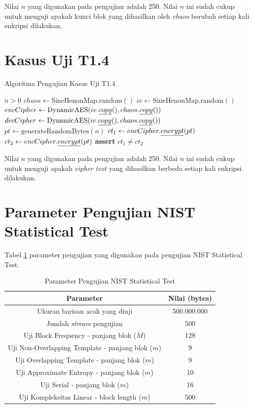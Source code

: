 Nilai $n$ yang digunakan pada pengujian adalah 250. Nilai $n$ ini sudah cukup untuk menguji apakah kunci blok yang dihasilkan oleh \emph{chaos} berubah setiap kali enkripsi dilakukan.

\section{Kasus Uji T1.4}

\begin{algorithm}
  \caption{Algoritma Pengujian Kasus Uji T1.4}
  \label{alg:unit.test.t1.4}
  \begin{algorithmic}
    \Require $n > 0$
    \State $chaos \gets \text{SineHenonMap.random}()$ 
    \State $iv \gets \text{SineHenonMap.random}()$
    \State $encCipher \gets \text{DynamicAES}(iv.\emph{copy}(), chaos.\emph{copy}())$
    \State $decCipher \gets \text{DynamicAES}(iv.\emph{copy}(), chaos.\emph{copy}())$
    \State
    \State $pt \gets \text{generateRandomBytes}(n)$ 
    \State $ct_1 \gets encCipher.\emph{encrypt}(pt)$
    \State $ct_2 \gets encCipher.\emph{encrypt}(pt)$
    \State
    \State \textbf{assert} $ct_1 \ne ct_2$
  \end{algorithmic}
\end{algorithm}

Nilai $n$ yang digunakan pada pengujian adalah 250. Nilai $n$ ini sudah cukup untuk menguji apakah \emph{cipher text} yang dihasilkan berbeda setiap kali enkripsi dilakukan.

\section{Parameter Pengujian NIST Statistical Test}

Tabel \ref{tab:param.statistic.test} parameter pengujian yang digunakan pada pengujian NIST Statistical Test.

\begin{table}[h]
  \centering
  \caption{Parameter Pengujian NIST Statistical Test}
  \label{tab:param.statistic.test}
  \begin{tabular}{|c|c|}
    \hline
    \textbf{Parameter} & \textbf{Nilai (bytes)} \\
    \hline
    {Ukuran barisan acak yang diuji} & 500.000.000 \\
    \hline
    {Jumlah \emph{stream} pengujian} & 500 \\
    \hline
    {Uji Block Frequency - panjang blok ($M$)} & 128 \\
    \hline
    {Uji Non-Overlapping Template - panjang blok ($m$)} & 9 \\
    \hline
    {Uji Overlapping Template - panjang blok ($m$)} & 9 \\
    \hline
    {Uji Approximate Entropy - panjang blok ($m$)} & 10 \\
    \hline
    {Uji Serial - panjang blok ($m$)} & 16 \\
    \hline
    {Uji Kompleksitas Linear - block length ($m$)} & 500 \\
    \hline
  \end{tabular}
\end{table}

